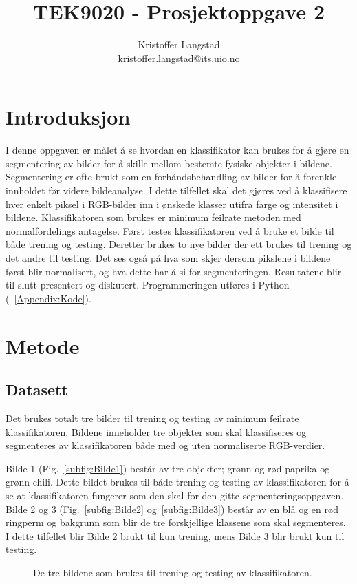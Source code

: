 \documentclass[twocolumn,norwegian]{article}
\title{TEK9020 - Prosjektoppgave 2}
\author{Kristoffer Langstad \\ kristoffer.langstad@its.uio.no}
\date{}
\begin{document}
	
	\maketitle
	
	\section{Introduksjon}
	I denne oppgaven er målet å se hvordan en klassifikator kan brukes for å gjøre en segmentering av bilder for å skille mellom bestemte fysiske objekter i bildene. Segmentering er ofte brukt som en forhåndsbehandling av bilder for å forenkle innholdet før videre bildeanalyse. I dette tilfellet skal det gjøres ved å klassifisere hver enkelt piksel i RGB-bilder inn i ønskede klasser utifra farge og intensitet i bildene. Klassifikatoren som brukes er minimum feilrate metoden med normalfordelings antagelse. Først testes klassifikatoren ved å bruke et bilde til både trening og testing. Deretter brukes to nye bilder der ett brukes til trening og det andre til testing. Det ses også på hva som skjer dersom pikslene i bildene først blir normalisert, og hva dette har å si for segmenteringen. Resultatene blir til slutt presentert og diskutert. Programmeringen utføres i Python (~\ref{Appendix:Kode}).


	\section{Metode}
	\subsection{Datasett}
	Det brukes totalt tre bilder til trening og testing av minimum feilrate klassifikatoren. Bildene inneholder tre objekter som skal klassifiseres og segmenteres av klassifikatoren både med og uten normaliserte RGB-verdier.
	
	Bilde 1 (Fig.~\ref{subfig:Bilde1}) består av tre objekter; grønn og rød paprika og grønn chili. Dette bildet brukes til både trening og testing av klassifikatoren for å se at klassifikatoren fungerer som den skal for den gitte segmenteringsoppgaven. Bilde 2 og 3 (Fig.~\ref{subfig:Bilde2} og~\ref{subfig:Bilde3}) består av en blå og en rød ringperm og bakgrunn som blir de tre forskjellige klassene som skal segmenteres. I dette tilfellet blir Bilde 2 brukt til kun trening, mens Bilde 3 blir brukt kun til testing. 
	
	\begin{figure*}[ht!]
		\centering
		\caption{De tre bildene som brukes til trening og testing av klassifikatoren. \label{fig:Datasett}
		}
	\end{figure*}
\end{document}
